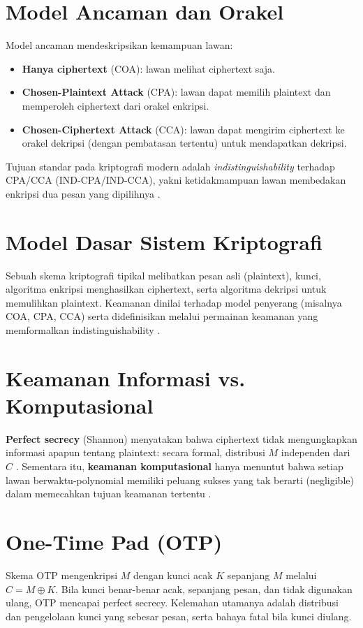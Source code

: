 \documentclass[../main.tex]{subfiles}
\begin{document}
\section{Model Ancaman dan Orakel}
Model ancaman mendeskripsikan kemampuan lawan:
\begin{itemize}
  \item \textbf{Hanya ciphertext} (COA): lawan melihat ciphertext saja.
  \item \textbf{Chosen-Plaintext Attack} (CPA): lawan dapat memilih plaintext dan memperoleh ciphertext dari orakel enkripsi.
  \item \textbf{Chosen-Ciphertext Attack} (CCA): lawan dapat mengirim ciphertext ke orakel dekripsi (dengan pembatasan tertentu) untuk mendapatkan dekripsi.
\end{itemize}
Tujuan standar pada kriptografi modern adalah \emph{indistinguishability} terhadap CPA/CCA (IND-CPA/IND-CCA), yakni ketidakmampuan lawan membedakan enkripsi dua pesan yang dipilihnya \citep{katzlindell,bonehshoup}.

\section{Model Dasar Sistem Kriptografi}
Sebuah skema kriptografi tipikal melibatkan pesan asli (plaintext), kunci, algoritma enkripsi menghasilkan ciphertext, serta algoritma dekripsi untuk memulihkan plaintext. Keamanan dinilai terhadap model penyerang (misalnya COA, CPA, CCA) serta didefinisikan melalui permainan keamanan yang memformalkan indistinguishability \citep{katzlindell,bonehshoup}.

\section{Keamanan Informasi vs. Komputasional}
\textbf{Perfect secrecy} (Shannon) menyatakan bahwa ciphertext tidak mengungkapkan informasi apapun tentang plaintext: secara formal, distribusi \(M\) independen dari \(C\) \citep{shannon1949}. Sementara itu, \textbf{keamanan komputasional} hanya menuntut bahwa setiap lawan berwaktu-polynomial memiliki peluang sukses yang tak berarti (negligible) dalam memecahkan tujuan keamanan tertentu \citep{katzlindell}.

\section{One-Time Pad (OTP)}
Skema OTP mengenkripsi \(M\) dengan kunci acak \(K\) sepanjang \(M\) melalui \(C=M\oplus K\). Bila kunci benar-benar acak, sepanjang pesan, dan tidak digunakan ulang, OTP mencapai perfect secrecy. Kelemahan utamanya adalah distribusi dan pengelolaan kunci yang sebesar pesan, serta bahaya fatal bila kunci diulang.
\end{document}
